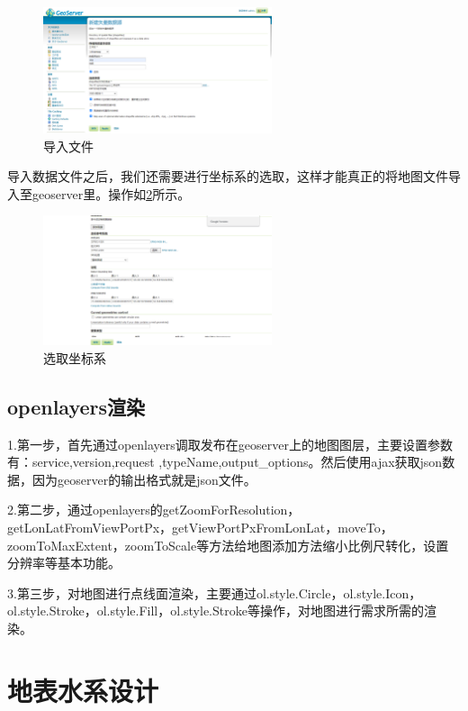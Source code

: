 \begin{figure}[!htb]%
	\centering
	\includegraphics[width=0.60\textwidth]{figs/添加文件.png}
	\caption{导入文件}
	\label{fig:tianjiawenjian}
\end{figure}
导入数据文件之后，我们还需要进行坐标系的选取，这样才能真正的将地图文件导入至geoserver里。操作如\ref{fig:zuobiaoxi}所示。
\begin{figure}[!htb]%
	\centering
	\includegraphics[width=0.60\textwidth,height=0.2\textheight]{figs/zuobiaoxi.png}
	\caption{选取坐标系}
	\label{fig:zuobiaoxi}
\end{figure}
\subsection{openlayers渲染}
1.第一步，首先通过openlayers调取发布在geoserver上的地图图层，主要设置参数有：service,version,request ,typeName,output\_options。然后使用ajax获取json数据，因为geoserver的输出格式就是json文件。

2.第二步，通过openlayers的getZoomForResolution，getLonLatFromViewPortPx，getViewPortPxFromLonLat，moveTo，zoomToMaxExtent，zoomToScale等方法给地图添加方法缩小比例尺转化，设置分辨率等基本功能。

3.第三步，对地图进行点线面渲染，主要通过ol.style.Circle，ol.style.Icon，ol.style.Stroke，ol.style.Fill，ol.style.Stroke等操作，对地图进行需求所需的渲染。

\section{地表水系设计}


